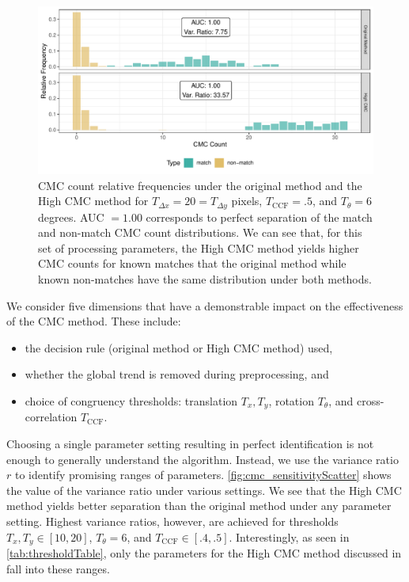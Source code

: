 \begin{Schunk}
\begin{figure}[htbp]

\includegraphics[width=\textwidth]{figures/cmcr-unnamed-chunk-19-1} \hfill{}

\caption{\label{fig:decisionRuleSensitivity_comparison} CMC count relative frequencies under the original method and the High CMC method for $T_{\Delta x} = 20 = T_{\Delta y}$ pixels, $T_{\text{CCF}} = .5$, and $T_{\theta} = 6$ degrees. AUC $= 1.00$ corresponds to perfect separation of the match and non-match CMC count distributions. We can see that, for this set of processing parameters, the High CMC method yields higher CMC counts for known matches that the original method while known non-matches have the same distribution under both methods.}\label{fig:unnamed-chunk-19}
\end{figure}
\end{Schunk}

We consider five dimensions that have a demonstrable impact on the
effectiveness of the CMC method. These include:

\begin{itemize}
\item the decision rule (original method or High CMC method) used,

\item whether the global trend is removed during preprocessing, and

\item choice of congruency thresholds: translation $T_x, T_y$, rotation $T_\theta$, and cross-correlation $T_{\text{CCF}}$.
\end{itemize}

Choosing a single parameter setting resulting in perfect identification
is not enough to generally understand the algorithm. Instead, we use the
variance ratio \(r\) to identify promising ranges of parameters.
\autoref{fig:cmc_sensitivityScatter} shows the value of the variance
ratio under various settings. We see that the High CMC method yields
better separation than the original method under any parameter setting.
Highest variance ratios, however, are achieved for thresholds
\(T_x, T_y \in [10,20]\), \(T_\theta = 6\), and
\(T_{\text{CCF}} \in [.4,.5]\). Interestingly, as seen in
\autoref{tab:thresholdTable}, only the parameters for the High CMC
method discussed in \citet{song_estimating_2018} fall into these ranges.

